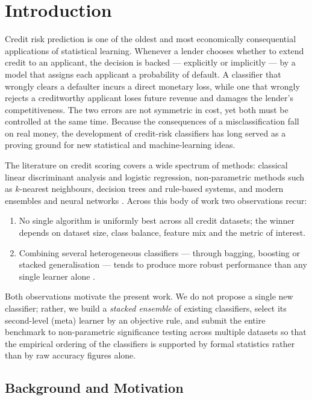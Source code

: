 \chapter{Introduction}\doublespacing
\label{Chapter1}

Credit risk prediction is one of the oldest and most economically
consequential applications of statistical learning. Whenever a lender
chooses whether to extend credit to an applicant, the decision is
backed --- explicitly or implicitly --- by a model that assigns each
applicant a probability of default. A classifier that wrongly clears
a defaulter incurs a direct monetary loss, while one that wrongly
rejects a creditworthy applicant loses future revenue and damages the
lender's competitiveness. The two errors are not symmetric in cost,
yet both must be controlled at the same time.
Because the consequences of a misclassification fall on real money,
the development of credit-risk classifiers has long served as a
proving ground for new statistical and machine-learning ideas.

The literature on credit scoring covers a wide spectrum of methods:
classical linear discriminant analysis and logistic regression, non-parametric methods
such as $k$-nearest neighbours, decision trees and rule-based systems, and modern ensembles and neural networks
\citep{breiman2001random,chen2016xgboost}. Across this
body of work two observations recur:
\begin{enumerate}
 \item No single algorithm is uniformly best across all credit
 datasets; the winner depends on dataset size, class balance,
 feature mix and the metric of interest.
 \item Combining several heterogeneous classifiers --- through bagging,
 boosting or stacked generalisation --- tends to produce more
 robust performance than any single learner alone
 \citep{wolpert1992stacked}.
\end{enumerate}
Both observations motivate the present work. We do not propose a
single new classifier; rather, we build a \emph{stacked ensemble} of
existing classifiers, select its second-level (meta) learner by an
objective rule, and submit the entire benchmark to non-parametric
significance testing across multiple datasets so that the empirical
ordering of the classifiers is supported by formal statistics rather
than by raw accuracy figures alone.

\section{Background and Motivation}
\label{sec:motivation}

